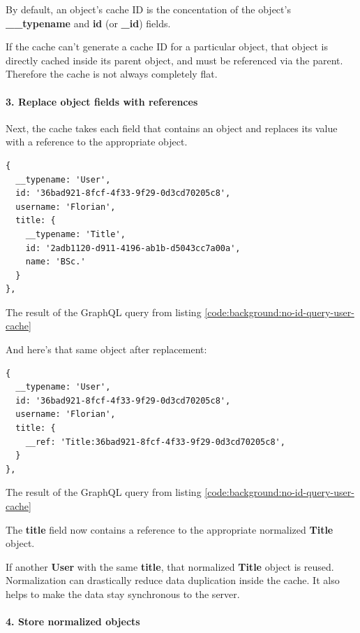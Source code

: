 By default, an object's cache ID is the concentation of the object's \textbf{\_\_typename} and \textbf{id} (or \textbf{\_id}) fields.

If the cache can't generate a cache ID for a particular object, that object is directly cached inside its parent object, and must be referenced via the parent. Therefore the cache is not always completely flat.

\paragraph{3. Replace object fields with references} 

Next, the cache takes each field that contains an object and replaces its value with a reference to the appropriate object.

\ifshowListings
\begin{listing}[H]
\begin{verbatim}
{
  __typename: 'User',
  id: '36bad921-8fcf-4f33-9f29-0d3cd70205c8',
  username: 'Florian',
  title: {
    __typename: 'Title',
    id: '2adb1120-d911-4196-ab1b-d5043cc7a00a',
    name: 'BSc.'
  }
}, 
\end{verbatim}
\caption{The result of the GraphQL query from listing \ref{code:background:no-id-query-user-cache}}
\end{listing}
\fi

And here's that same object after replacement:

\ifshowListings
\begin{listing}[H]
\begin{verbatim}
{
  __typename: 'User',
  id: '36bad921-8fcf-4f33-9f29-0d3cd70205c8',
  username: 'Florian',
  title: {
    __ref: 'Title:36bad921-8fcf-4f33-9f29-0d3cd70205c8',
  }
}, 
\end{verbatim}
\caption{The result of the GraphQL query from listing \ref{code:background:no-id-query-user-cache}}
\end{listing}
\fi

The \textbf{title} field now contains a reference to the appropriate normalized \textbf{Title} object.

If another \textbf{User} with the same \textbf{title}, that normalized \textbf{Title} object is reused. Normalization can drastically reduce data duplication inside the cache. It also helps to make the data stay synchronous to the server.

\paragraph{4. Store normalized objects} 

